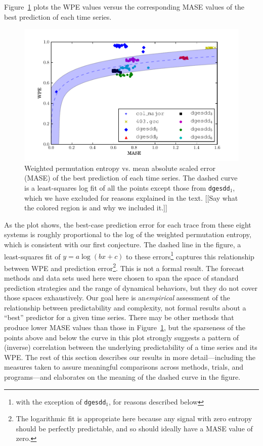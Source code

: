 Figure~\ref{fig:wpe_vs_mase_best} plots the WPE values versus the
corresponding MASE values of the best prediction of each time series.
\begin{figure}[htbp]
  \centering
  \includegraphics[width=\columnwidth]{figs/new_prediction_vs_entropy_autolog}
  \caption{Weighted permutation entropy vs. mean absolute scaled error
    (MASE) of the best prediction of each time series.
%
%
The dashed curve is a least-squares log fit of all the points except
those from {\tt dgesdd$_1$}, which we have excluded for reasons
explained in the text.  [[Say what the colored region is and why we
    included it.]]}
  \label{fig:wpe_vs_mase_best}
\end{figure}
As the plot shows, the best-case prediction error for each trace from
these eight systems is roughly proportional to the log of the weighted
permutation entropy, which is consistent with our first conjecture.
The dashed line in the figure, a least-squares fit of $y = a \log(b x
+ c)$ to these errors\footnote{with the exception of {\tt dgesdd$_1$},
  for reasons described below} captures this relationship between WPE
and prediction error\footnote{The logarithmic fit is appropriate here
  because any signal with zero entropy should be perfectly
  predictable, and so should ideally have a MASE value of zero.}.
This is not a formal result.  The forecast methods and data sets used
here were chosen to span the space of standard prediction strategies
and the range of dynamical behaviors, but they do not cover those
spaces exhaustively.  Our goal here is an\emph{empirical} assessment
of the relationship between predictability and complexity, not formal
results about a ``best'' predictor for a given time series.  There may
be other methods that produce lower MASE values than those in
Figure~\ref{fig:wpe_vs_mase_best}, but the sparseness of the points
above and below the curve in this plot strongly suggests a pattern of
(inverse) correlation between the underlying predictability of a time
series and its WPE.  The rest of this section describes our results in
more detail---including the measures taken to assure meaningful
comparisons across methods, trials, and programs---and elaborates on
the meaning of the dashed curve in the figure.


